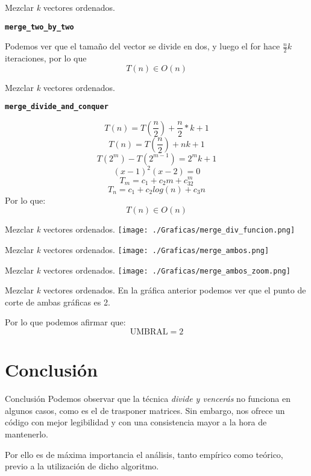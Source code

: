 \documentclass[10pt, xcolor=table]{beamer}
\begin{document}
\begin{frame}[fragile]{Mezclar \textit{k} vectores ordenados. }
\begin{center}
\textbf{\large{\texttt{merge\_two\_by\_two}}}
\end{center}
Podemos ver que el tamaño del vector se divide en dos, y luego el for hace $\frac{n}{2}k$ iteraciones, por lo que 
$$T(n) \in O(n)$$ 
\end{frame}
\begin{frame}[fragile]{Mezclar \textit{k} vectores ordenados. }
\begin{center}
\textbf{\large{\texttt{merge\_divide\_and\_conquer}}}
\end{center}

$$T(n)=T(\frac{n}{2})+\frac{n}{2}*k +1 $$
$$T(n) = T(\frac{n}{2}) + nk +1$$
$$T(2^m) - T(2^{m-1}) = 2^mk+1$$
$$(x-1)^2(x-2) = 0$$
$$T_m = c_1 + c_2m +c_32^m$$
$$T_n = c_1 + c_2log(n) + c_3n$$
Por lo que:
$$T(n) \in O(n)$$
\end{frame}


\begin{frame}[fragile]{Mezclar \textit{k} vectores ordenados. }
\texttt{[image: ./Graficas/merge\_div\_funcion.png]}
\end{frame}

\begin{frame}[fragile]{Mezclar \textit{k} vectores ordenados. }
\texttt{[image: ./Graficas/merge\_ambos.png]}
\end{frame}
\begin{frame}[fragile]{Mezclar \textit{k} vectores ordenados. }
\texttt{[image: ./Graficas/merge\_ambos\_zoom.png]}
\end{frame}
\begin{frame}[fragile]{Mezclar \textit{k} vectores ordenados. }
En la gráfica anterior podemos ver que el punto de corte de ambas gráficas es 2.

Por lo que podemos afirmar que:
$$\text{UMBRAL} = 2$$
\end{frame}


\section{Conclusión}

\begin{frame}{Conclusión}
Podemos observar que la técnica \emph{divide y vencerás} no funciona en algunos casos, como es el de trasponer matrices. Sin embargo, nos ofrece un código con mejor legibilidad y con una consistencia mayor a la hora de mantenerlo.

Por ello es de máxima importancia el análisis, tanto empírico como teórico, previo a la utilización de dicho algoritmo.

\end{frame}
\end{document}
